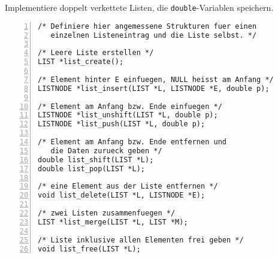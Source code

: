 \documentclass{uebungszettel}
\begin{document}
\begin{aufg}
Implementiere doppelt verkettete Listen, die \verb|double|-Variablen speichern.

\medskip\begin{codelisting}
\begin{lstlisting}[numbers=left,numberstyle=\tiny,frame=tlrb]
/* Definiere hier angemessene Strukturen fuer einen
   einzelnen Listeneintrag und die Liste selbst. */

/* Leere Liste erstellen */
LIST *list_create();

/* Element hinter E einfuegen, NULL heisst am Anfang */
LISTNODE *list_insert(LIST *L, LISTNODE *E, double p);

/* Element am Anfang bzw. Ende einfuegen */
LISTNODE *list_unshift(LIST *L, double p);
LISTNODE *list_push(LIST *L, double p);

/* Element am Anfang bzw. Ende entfernen und 
   die Daten zurueck geben */
double list_shift(LIST *L);
double list_pop(LIST *L);

/* eine Element aus der Liste entfernen */
void list_delete(LIST *L, LISTNODE *E);

/* zwei Listen zusammenfuegen */
LIST *list_merge(LIST *L, LIST *M);

/* Liste inklusive allen Elementen frei geben */
void list_free(LIST *L);

\end{lstlisting}
\end{codelisting}
\end{aufg}
\end{document}
